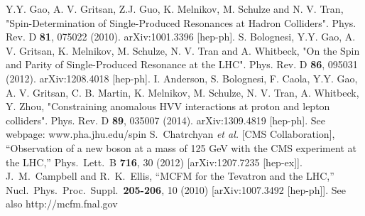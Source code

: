 \documentclass[aps,superscriptaddress,nofootinbib]{revtex4}
\begin{document}
\begin{thebibliography}{99}
Y.Y. Gao, A. V. Gritsan, Z.J. Guo, K. Melnikov, M. Schulze and N. V. Tran, "Spin-Determination of Single-Produced Resonances at Hadron Colliders". Phys. Rev. D {\bf 81}, 075022 (2010). arXiv:1001.3396 [hep-ph].
S. Bolognesi, Y.Y. Gao, A. V. Gritsan, K. Melnikov, M. Schulze, N. V. Tran and A. Whitbeck, "On the Spin and Parity of Single-Produced Resonance at the LHC". Phys. Rev. D {\bf 86}, 095031 (2012). arXiv:1208.4018 [hep-ph].
I. Anderson, S. Bolognesi, F. Caola, Y.Y. Gao, A. V. Gritsan, C. B. Martin, K. Melnikov, M. Schulze, N. V. Tran, A. Whitbeck, Y. Zhou, "Constraining anomalous HVV interactions at proton and lepton colliders". Phys. Rev. D {\bf 89}, 035007 (2014). arXiv:1309.4819 [hep-ph].
See webpage: www.pha.jhu.edu/spin
  S.~Chatrchyan {\it et al.}  [CMS Collaboration],
  ``Observation of a new boson at a mass of 125 GeV with the CMS experiment at the LHC,''
  Phys.\ Lett.\ B {\bf 716}, 30 (2012)
  [arXiv:1207.7235 [hep-ex]].
  J.~M.~Campbell and R.~K.~Ellis,
  ``MCFM for the Tevatron and the LHC,''
  Nucl.\ Phys.\ Proc.\ Suppl.\  {\bf 205-206}, 10 (2010)
  [arXiv:1007.3492 [hep-ph]].
  See also http://mcfm.fnal.gov
%
\end{thebibliography}
\end{document}
